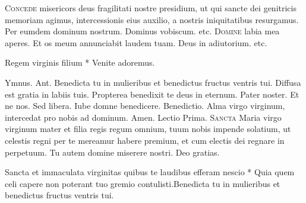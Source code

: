 \begin{multicols*}{2}
\lettrine[lines=2]{\zallmancaps \color{Blue} C}{oncede} misericors deus fragilitati nostre presidium, ut qui sancte dei genitricis memoriam agimus, intercessionis eius auxilio, a nostris iniquitatibus resurgamus. Per eumdem dominum nostrum. Dominus vobiscum. etc.
{\color{Red} }
\lettrine[lines=2]{\zallmancaps \color{Red} D}{omine} labia mea aperes. Et os meum annunciabit laudem tuam. Deus in adiutorium. etc.
\begin{invitatory-full}
{Regem virginis filium * Venite adoremus.}
\end{invitatory-full}
{\color{Red} Ymnus.}
{\color{Red} Ant.} Benedicta tu in mulieribus et benedictus fructus ventris tui.
\V Diffusa est gratia in labiis tuis. \R Propterea benedixit te deus in eternum. Pater noster. Et ne nos. Sed libera. Iube domne benedicere. {\color{Red} Benedictio.} Alma virgo virginum, intercedat pro nobis ad dominum. Amen. {\color{Red} Lectio Prima.}
\lettrine[lines=2]{\zallmancaps \color{Blue} S}{ancta} Maria virgo virginum mater et filia regis regum omnium, tuum nobis impende solatium, ut celestis regni per te mereamur habere premium, et cum electis dei regnare in perpetuum. Tu autem domine miserere nostri. Deo gratias.
\begin{responsory}
{Sancta et immaculata virginitas quibus te laudibus efferam nescio * Quia quem celi capere non poterant tuo gremio contulisti.}{Benedicta tu in mulieribus et benedictus fructus ventris tui.}
\end{responsory}

\end{multicols*}
